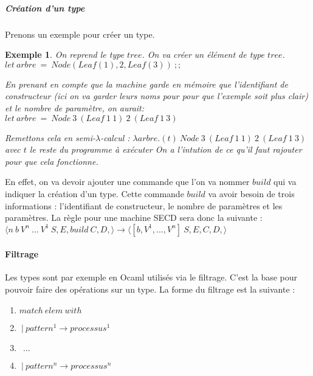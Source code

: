 \documentclass[10pt,a4paper]{report}
\newtheorem{ex}{Exemple}
\begin{document}
		\subparagraph{Création d'un type } Prenons un exemple pour créer un type.
		
		\begin{ex}
			On reprend le type $tree$. On va créer un élément de type $tree$.
			\smallbreak
			$let~arbre~=~Node(Leaf(1),2,Leaf(3))~;;$
			\medbreak
			
			En prenant en compte que la machine garde en mémoire que l'identifiant de constructeur (ici on va garder leurs noms pour pour que l'exemple soit plus clair) et le nombre de paramètre, on aurait:
			\smallbreak
			$let~arbre~=~Node~3~(Leaf~1~1)~2~(Leaf~1~3)$
			\medbreak 
			
			Remettons cela en semi-$\lambda$-calcul :
			\smallbreak
			$\lambda arbre.(t)~Node~3~(Leaf~1~1)~2~(Leaf~1~3)$ avec $t$ le reste du programme à exécuter
			\smallbreak
			On a l'intution de ce qu'il faut rajouter pour que cela fonctionne.
		\end{ex}
	
		En effet, on va devoir ajouter une commande que l'on va nommer $build$ qui va indiquer la création d'un type. Cette commande  $build$ va avoir besoin de trois informations : l'identifiant de constructeur, le nombre de paramètres et les paramètres. La règle pour une machine SECD sera donc la suivante :
		\smallbreak
		$\langle n~b~V^{n}~...~V^{1}~S,E,build~C,D,\rangle
		\longrightarrow
		\langle [b,V^{1},...,V^{n}]~S,E,C,D,\rangle$
		
	\paragraph{Filtrage } Les types sont par exemple en Ocaml utilisés via le filtrage. C'est la base pour pouvoir faire des opérations sur un type. La forme du filtrage est la suivante :
	\begin{enumerate}
		\item $match~elem~with$
		\item $~|~pattern^{1} \rightarrow processus^{1}$
		\item $~~...$
		\item $~|~pattern^{n} \rightarrow processus^{n}$
	\end{enumerate}
	\bigbreak
	
\end{document}
